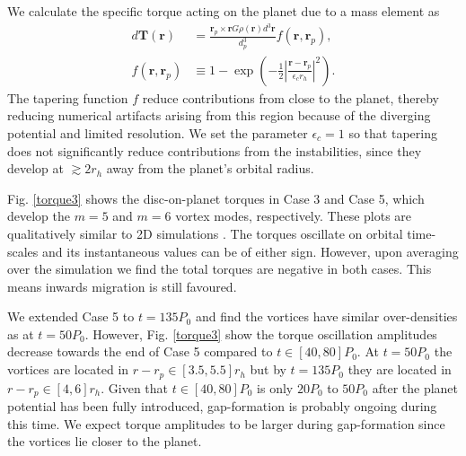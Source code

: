 We calculate the specific torque acting on the planet due to a mass
element as 
\begin{align}
d\bm{T}(\bm{r}) &=
\frac{\bm{r}_p\times\bm{r}G\rho(\bm{r})d^3\bm{r}}{d_p^3}f(\bm{r},\bm{r}_p),\\
f(\bm{r},\bm{r}_p)&\equiv 1
-\exp{\left(-\frac{1}{2}\left|\frac{\bm{r}-\bm{r}_p}{\epsilon_c
      r_h}\right|^2\right)}.  
\end{align} 
The tapering function $f$ reduce contributions from close to the
planet, thereby reducing numerical artifacts arising from this region
because of the diverging potential and limited resolution. We set  
the parameter $\epsilon_c=1$ so that tapering does not significantly
reduce contributions from the instabilities, since they develop
at $\gtrsim 2r_h$ away from the planet's orbital radius.  

Fig. \ref{torque3} shows the disc-on-planet torques in Case 3 and Case 5, which develop
the $m=5$ and $m=6$ vortex modes, respectively. These plots are qualitatively similar to
2D simulations \citep[e.g.][]{li05}. The torques oscillate on orbital 
time-scales and its instantaneous values can be of either sign. However, 
upon averaging over the simulation we find the total torques are negative in both cases. This
means inwards migration is still favoured. 

We extended Case 5 to $t=135P_0$ and find the vortices 
have similar over-densities as at $t=50P_0$. However, 
Fig. \ref{torque3} show the torque oscillation amplitudes decrease
towards the end of Case 5 compared to $t\in[40,80]P_0$.  
At $t=50P_0$ the vortices are located in $r-r_p\in[3.5,5.5]r_h$ but by
$t=135P_0$ they are located in $r-r_p\in[4,6]r_h$. 
Given that $t\in[40,80]P_0$ is only $20P_0$ to $50P_0$ after the planet  
potential has been fully introduced, gap-formation is probably 
ongoing during this time. We expect torque amplitudes to be larger
during  gap-formation since the vortices lie closer to the planet. 



